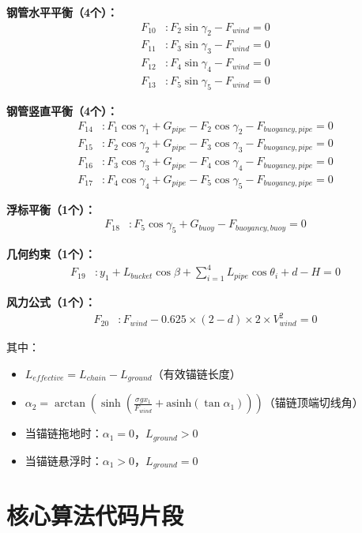 \documentclass[withoutpreface,bwprint]{cumcmthesis}
\begin{document}
\begin{appendices}
\textbf{钢管水平平衡（4个）：}
\begin{align}
F_{10} &: F_2 \sin\gamma_2 - F_{wind} = 0 \\
F_{11} &: F_3 \sin\gamma_3 - F_{wind} = 0 \\
F_{12} &: F_4 \sin\gamma_4 - F_{wind} = 0 \\
F_{13} &: F_5 \sin\gamma_5 - F_{wind} = 0
\end{align}

\textbf{钢管竖直平衡（4个）：}
\begin{align}
F_{14} &: F_1 \cos\gamma_1 + G_{pipe} - F_2 \cos\gamma_2 - F_{buoyancy,pipe} = 0 \\
F_{15} &: F_2 \cos\gamma_2 + G_{pipe} - F_3 \cos\gamma_3 - F_{buoyancy,pipe} = 0 \\
F_{16} &: F_3 \cos\gamma_3 + G_{pipe} - F_4 \cos\gamma_4 - F_{buoyancy,pipe} = 0 \\
F_{17} &: F_4 \cos\gamma_4 + G_{pipe} - F_5 \cos\gamma_5 - F_{buoyancy,pipe} = 0
\end{align}

\textbf{浮标平衡（1个）：}
\begin{align}
F_{18} &: F_5 \cos\gamma_5 + G_{buoy} - F_{buoyancy,buoy} = 0
\end{align}

\textbf{几何约束（1个）：}
\begin{align}
F_{19} &: y_1 + L_{bucket}\cos\beta + \sum_{i=1}^{4}L_{pipe}\cos\theta_i + d - H = 0
\end{align}

\textbf{风力公式（1个）：}
\begin{align}
F_{20} &: F_{wind} - 0.625 \times (2-d) \times 2 \times V_{wind}^2 = 0
\end{align}

其中：
\begin{itemize}
\item $L_{effective} = L_{chain} - L_{ground}$（有效锚链长度）
\item $\alpha_2 = \arctan\left(\sinh\left(\frac{\sigma g x_1}{F_{wind}} + \text{asinh}(\tan\alpha_1)\right)\right)$（锚链顶端切线角）
\item 当锚链拖地时：$\alpha_1 = 0$，$L_{ground} > 0$
\item 当锚链悬浮时：$\alpha_1 > 0$，$L_{ground} = 0$
\end{itemize}

\section{核心算法代码片段}


\end{appendices}
\end{document}

